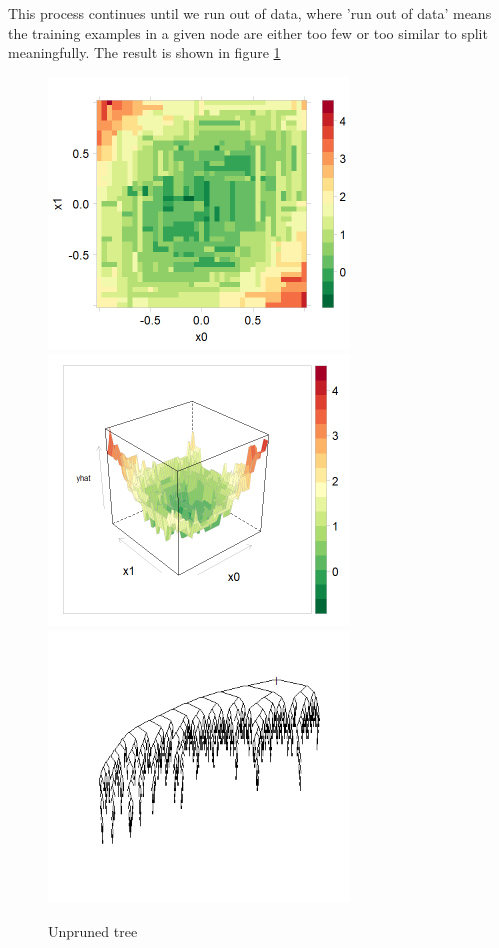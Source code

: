 \documentclass[10pt,openany]{article}
\numberwithin{definition}{section}
\numberwithin{example}{section}
\numberwithin{equation}{section}
\numberwithin{figure}{section}
\begin{document}
This process continues until we run out of data, where 'run out of
data' means the training examples in a given node are either too few
or too similar to split meaningfully. The result is shown in figure
\ref{fig:unpruned-tree}

\begin{figure}
\noindent \begin{centering}
\includegraphics[width=80mm]{fig/rpart-unpruned-levelplot}~
\includegraphics[width=80mm]{fig/rpart-unpruned-wireframe}~
\includegraphics[width=80mm]{fig/rpart-unpruned-tree}
\par\end{centering}

\protect\caption{\label{fig:unpruned-tree}Unpruned tree}
\end{figure}
\end{document}

